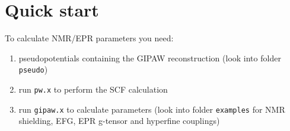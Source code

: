 \documentclass[a4paper,11pt,twoside]{article}
\begin{document}
\section{Quick start}
To calculate NMR/EPR parameters you need: 
\begin{enumerate}
\item pseudopotentials containing the GIPAW reconstruction (look into
folder \texttt{pseudo})
\item run \texttt{pw.x} to perform the SCF calculation 
\item run \texttt{gipaw.x} to calculate parameters (look into folder
\texttt{examples} for NMR shielding, EFG, EPR g-tensor and hyperfine
couplings)
\end{enumerate}

\end{document}
